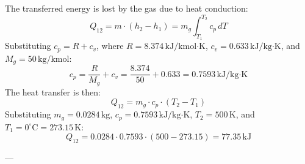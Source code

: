 The transferred energy is lost by the gas due to heat conduction:  
\[
Q_{12} = m \cdot (h_2 - h_1) = m_g \int_{T_1}^{T_2} c_p \, dT
\]  
Substituting \( c_p = R + c_v \), where \( R = 8.374 \, \text{kJ/kmol·K} \), \( c_v = 0.633 \, \text{kJ/kg·K} \), and \( M_g = 50 \, \text{kg/kmol} \):  
\[
c_p = \frac{R}{M_g} + c_v = \frac{8.374}{50} + 0.633 = 0.7593 \, \text{kJ/kg·K}
\]  
The heat transfer is then:  
\[
Q_{12} = m_g \cdot c_p \cdot (T_2 - T_1)
\]  
Substituting \( m_g = 0.0284 \, \text{kg} \), \( c_p = 0.7593 \, \text{kJ/kg·K} \), \( T_2 = 500 \, \text{K} \), and \( T_1 = 0^\circ\text{C} = 273.15 \, \text{K} \):  
\[
Q_{12} = 0.0284 \cdot 0.7593 \cdot (500 - 273.15) = 77.35 \, \text{kJ}
\]  

---
